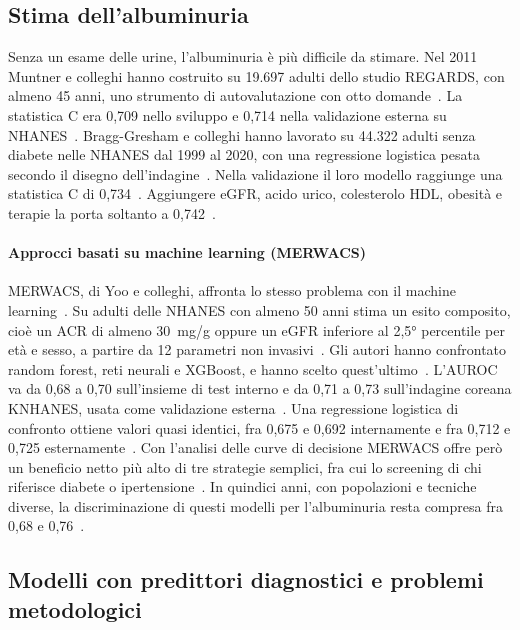 \documentclass[a4paper, 12pt, oneside]{book}
\begin{document}
\subsection{Stima dell'albuminuria}

Senza un esame delle urine, l'albuminuria è più difficile da stimare. Nel 2011 Muntner e colleghi hanno costruito su 19.697 adulti dello studio REGARDS, con almeno 45 anni, uno strumento di autovalutazione con otto domande~\cite{muntner_development_2011}. La statistica C era 0,709 nello sviluppo e 0,714 nella validazione esterna su NHANES~\cite{muntner_development_2011}. Bragg-Gresham e colleghi hanno lavorato su 44.322 adulti senza diabete nelle NHANES dal 1999 al 2020, con una regressione logistica pesata secondo il disegno dell'indagine~\cite{bragg-gresham_using_2025}. Nella validazione il loro modello raggiunge una statistica C di 0,734~\cite{bragg-gresham_using_2025}. Aggiungere eGFR, acido urico, colesterolo HDL, obesità e terapie la porta soltanto a 0,742~\cite{bragg-gresham_using_2025}.

\paragraph{Approcci basati su machine learning (MERWACS)} MERWACS, di Yoo e colleghi, affronta lo stesso problema con il machine learning~\cite{yoo_merwacs_2026}. Su adulti delle NHANES con almeno 50 anni stima un esito composito, cioè un ACR di almeno 30~mg/g oppure un eGFR inferiore al 2,5° percentile per età e sesso, a partire da 12 parametri non invasivi~\cite{yoo_merwacs_2026}. Gli autori hanno confrontato random forest, reti neurali e XGBoost, e hanno scelto quest'ultimo~\cite{yoo_merwacs_2026}. L'AUROC va da 0,68 a 0,70 sull'insieme di test interno e da 0,71 a 0,73 sull'indagine coreana KNHANES, usata come validazione esterna~\cite{yoo_merwacs_2026}. Una regressione logistica di confronto ottiene valori quasi identici, fra 0,675 e 0,692 internamente e fra 0,712 e 0,725 esternamente~\cite{yoo_merwacs_2026}. Con l'analisi delle curve di decisione MERWACS offre però un beneficio netto più alto di tre strategie semplici, fra cui lo screening di chi riferisce diabete o ipertensione~\cite{yoo_merwacs_2026}. In quindici anni, con popolazioni e tecniche diverse, la discriminazione di questi modelli per l'albuminuria resta compresa fra 0,68 e 0,76~\cite{muntner_development_2011,bragg-gresham_using_2025,yoo_merwacs_2026}.

\subsection{Modelli con predittori diagnostici e problemi metodologici}
\end{document}
